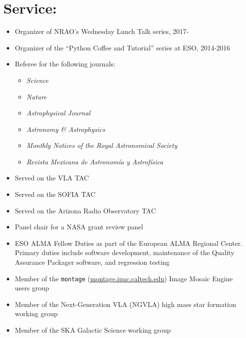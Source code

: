 
\section*{Service:}
\vspace{-10pt}
\begin{itemize}
\itemsep-3pt
        
    \item Organizer of NRAO's Wednesday Lunch Talk series, 2017-
    \item Organizer of the ``Python Coffee and Tutorial'' series at ESO, 2014-2016
    \item Referee for the following journals:
        \begin{itemize}
            \itemsep-3pt
            \item \textit{Science}
            \item \textit{Nature}
            \item \textit{Astrophysical Journal}
            \item \textit{Astronomy \& Astrophysics}
            \item \textit{Monthly Notices of the Royal Astronomical Society}
            \item \textit{Revista Mexicana de Astronom{\'i}a y Astrof{\'i}sica}
    \end{itemize}
    \item Served on the VLA TAC
    \item Served on the SOFIA TAC
    \item Served on the Arizona Radio Observatory TAC
    \item Panel chair for a NASA grant review panel
    \item ESO ALMA Fellow Duties as part of the European ALMA Regional Center.
        Primary duties include software development, maintenance of the
        Quality Assurance Packager software, and regression testing
    \item Member of the \texttt{montage} (\url{montage.ipac.caltech.edu}) Image
        Mosaic Engine users group
    \item Member of the Next-Generation VLA (NGVLA) high mass star formation
        working group
    \item Member of the SKA Galactic Science
        working group
\end{itemize}
